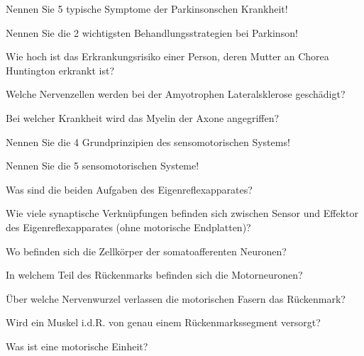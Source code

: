 \documentclass[10pt, a4paper]{exam}
\begin{document}
\begin{questions}
  \question Nennen Sie 5 typische Symptome der Parkinsonschen Krankheit!
  \begin{solution}
  \end{solution}
  \question Nennen Sie die 2 wichtigsten Behandlungsstrategien bei Parkinson!
  \begin{solution}
  \end{solution}
  \question Wie hoch ist das Erkrankungsrisiko einer Person, deren Mutter an Chorea Huntington erkrankt ist?
  \begin{solution}
  \end{solution}
  \question Welche Nervenzellen werden bei der Amyotrophen Lateralsklerose geschädigt?
  \begin{solution}
  \end{solution}
  \question Bei welcher Krankheit wird das Myelin der Axone angegriffen?
  \begin{solution}
  \end{solution}
  \question Nennen Sie die 4 Grundprinzipien des sensomotorischen Systems!
  \begin{solution}
  \end{solution}
  \question Nennen Sie die 5 sensomotorischen Systeme!
  \begin{solution}
  \end{solution}
  \question Was sind die beiden Aufgaben des Eigenreflexapparates?
  \begin{solution}
  \end{solution}
  \question Wie viele synaptische Verknüpfungen befinden sich zwischen Sensor und Effektor des Eigenreflexapparates (ohne motorische Endplatten)?
  \begin{solution}
  \end{solution}
  \question Wo befinden sich die Zellkörper der somatoafferenten Neuronen?
  \begin{solution}
  \end{solution}
  \question In welchem Teil des Rückenmarks befinden sich die Motorneuronen?
  \begin{solution}
  \end{solution}
  \question Über welche Nervenwurzel verlassen die motorischen Fasern das Rückenmark?
  \begin{solution}
  \end{solution}
  \question Wird ein Muskel i.d.R. von genau einem Rückenmarkssegment versorgt?
  \begin{solution}
  \end{solution}
  \question Was ist eine motorische Einheit?

\end{questions}
\end{document}
